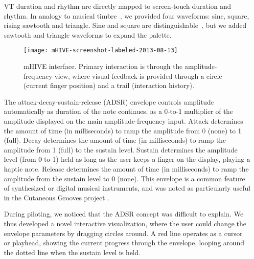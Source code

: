 
%
VT duration and rhythm are directly mapped to screen-touch duration and rhythm.
%
In analogy to musical timbre~\cite{Brewster2004, Gunther2002}, we provided four 
waveforms: sine, square, rising sawtooth %
and triangle.
%
Sine and square are %
distinguishable~\cite{Gunther2002}, but we added sawtooth and triangle waveforms to expand the palette.


\begin{figure}[Htb]
   \centering
	   \texttt{[image: mHIVE-screenshot-labeled-2013-08-13]} 
	   \caption{mHIVE interface. Primary interaction is through the amplitude-frequency view, where visual feedback is provided through a circle (current finger position) and a trail (interaction history).}
	   \label{fig:mHIVE}
    \end{figure}



The attack-decay-sustain-release (ADSR) envelope controls amplitude automatically as duration of the note continues, as a 0-to-1 multiplier of the amplitude displayed on the main amplitude-frequency input.
Attack determines the amount of time (in milliseconds) to ramp the amplitude from 0 (none) to 1 (full).
Decay determines the amount of time (in milliseconds) to ramp the amplitude from 1 (full) to the sustain level.
Sustain determines the amplitude level (from 0 to 1) held as long as the user keeps a finger on the display, playing a haptic note.
Release determines the amount of time (in milliseconds) to ramp the amplitude from the sustain level to 0 (none).
This envelope is a common feature of synthesized or digital musical instruments, and was noted as particularly useful in the Cutaneous Grooves project \cite{Gunther2002}.

During piloting, we noticed that the ADSR concept was difficult to explain.
We thus developed a novel interactive visualization, where the user could change the envelope parameters by dragging circles around.
A red line operates as a cursor or playhead, showing the current progress through the envelope, looping around the dotted line when the sustain level is held.

